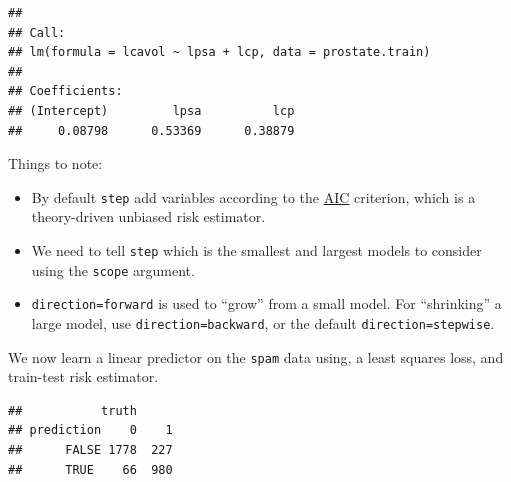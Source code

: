 \documentclass[]{book}
\newenvironment{Shaded}{\begin{snugshade}}{\end{snugshade}}
\newcommand{\KeywordTok}[1]{\textcolor[rgb]{0.13,0.29,0.53}{\textbf{#1}}}
\newcommand{\DataTypeTok}[1]{\textcolor[rgb]{0.13,0.29,0.53}{#1}}
\newcommand{\DecValTok}[1]{\textcolor[rgb]{0.00,0.00,0.81}{#1}}
\newcommand{\FloatTok}[1]{\textcolor[rgb]{0.00,0.00,0.81}{#1}}
\newcommand{\StringTok}[1]{\textcolor[rgb]{0.31,0.60,0.02}{#1}}
\newcommand{\CommentTok}[1]{\textcolor[rgb]{0.56,0.35,0.01}{\textit{#1}}}
\newcommand{\OperatorTok}[1]{\textcolor[rgb]{0.81,0.36,0.00}{\textbf{#1}}}
\newcommand{\NormalTok}[1]{#1}
\providecommand{\tightlist}{%
  \setlength{\itemsep}{0pt}\setlength{\parskip}{0pt}}
\theoremstyle{definition}
\theoremstyle{definition}
\theoremstyle{definition}
\theoremstyle{remark}
\begin{document}
\begin{verbatim}
## 
## Call:
## lm(formula = lcavol ~ lpsa + lcp, data = prostate.train)
## 
## Coefficients:
## (Intercept)         lpsa          lcp  
##     0.08798      0.53369      0.38879
\end{verbatim}

Things to note:

\begin{itemize}
\tightlist
\item
  By default \texttt{step} add variables according to the
  \href{https://en.wikipedia.org/wiki/Akaike_information_criterion}{AIC}
  criterion, which is a theory-driven unbiased risk estimator.
\item
  We need to tell \texttt{step} which is the smallest and largest models
  to consider using the \texttt{scope} argument.
\item
  \texttt{direction=\textquotesingle{}forward\textquotesingle{}} is used
  to ``grow'' from a small model. For ``shrinking'' a large model, use
  \texttt{direction=\textquotesingle{}backward\textquotesingle{}}, or
  the default
  \texttt{direction=\textquotesingle{}stepwise\textquotesingle{}}.
\end{itemize}

We now learn a linear predictor on the \texttt{spam} data using, a least
squares loss, and train-test risk estimator.

\begin{Shaded}
\end{Shaded}

\begin{verbatim}
##           truth
## prediction    0    1
##      FALSE 1778  227
##      TRUE    66  980
\end{verbatim}
\end{document}
